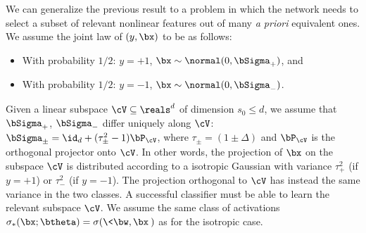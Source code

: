 \documentclass[11pt]{article}
\begin{document}
We can generalize the previous result to a problem in which the network needs to
 select a subset of relevant nonlinear features out of many \emph{a priori} equivalent ones. 
We assume the joint law of $(y,\bx)$ to be as follows:
%
\begin{itemize}
\item[] With probability $1/2$: $y=+1$, $\bx\sim\normal(0,\bSigma_+)$, and 
\item[] With probability $1/2$: $y=-1$, $\bx\sim\normal(0,\bSigma_-)$.
\end{itemize}
%
Given a linear subspace $\cV\subseteq \reals^d$ of dimension $s_0\le d$, we assume that $\bSigma_+$, $\bSigma_-$
differ uniquely along $\cV$: $\bSigma_{\pm} = \id_d+(\tau_\pm^2-1)\bP_{\cV}$, where $\tau_{\pm} = (1\pm\Delta)$
and $\bP_{\cV}$ is the orthogonal projector onto $\cV$. In other words,
the projection of $\bx$ on the subspace $\cV$ is distributed according to a isotropic Gaussian with variance $\tau_+^2$ (if
$y=+1$) or $\tau_-^2$ (if $y=-1$). The projection orthogonal to $\cV$ has instead the same variance in the two classes.
A successful classifier must be able to learn the relevant subspace $\cV$.
We assume the same class of activations $\sigma_*(\bx;\btheta) = \sigma(\<\bw,\bx\>)$ as for the isotropic case. 
\end{document}
